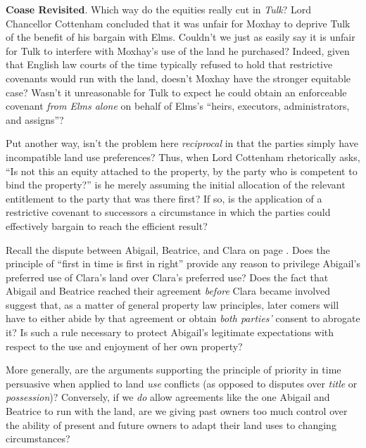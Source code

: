 
\item \textbf{Coase Revisited}. Which way do the equities really cut in
\textit{Tulk}? Lord Chancellor Cottenham concluded that it was unfair for Moxhay
to deprive Tulk of the benefit of his bargain with Elms. Couldn't we just as
easily say it is unfair for Tulk to interfere with Moxhay's use of the land he
purchased? Indeed, given that English law courts of the time typically refused
to hold that restrictive covenants would run with the land, doesn't Moxhay have
the stronger equitable case? Wasn't it unreasonable for Tulk to expect he could
obtain an enforceable covenant \textit{from Elms alone} on behalf of Elms's
``heirs, executors, administrators, and assigns''? 

\item Put another way, isn't the problem here \textit{reciprocal} in that the
parties simply have incompatible land use preferences? Thus, when Lord Cottenham
rhetorically asks, ``Is not this an equity attached to the property, by the
party who is competent to bind the property?'' is he merely assuming the initial
allocation of the relevant entitlement to the party that was there first? If so,
is the application of a restrictive covenant to successors a circumstance in
which the parties could effectively bargain to reach the efficient result?

\item Recall the dispute between Abigail, Beatrice, and Clara on page
\pageref{abigail-beatrice-clara}. Does the
principle of ``first in time is first in right'' provide any reason to privilege
Abigail's preferred use of Clara's land over Clara's preferred use? Does the
fact that Abigail and Beatrice reached their agreement \textit{before} Clara
became involved suggest that, as a matter of general property law principles,
later comers will have to either abide by that agreement or obtain \textit{both
parties'} consent to abrogate it? Is such a rule necessary to protect Abigail's
legitimate expectations with respect to the use and enjoyment of her own
property? 

\item More generally, are the arguments supporting the principle of priority in
time persuasive when applied to land \textit{use} conflicts (as opposed to
disputes over \textit{title} or \textit{possession})? Conversely, if we
\textit{do} allow agreements like the one Abigail and Beatrice to run with the
land, are we giving past owners too much control over the ability of present and
future owners to adapt their land uses to changing circumstances?

